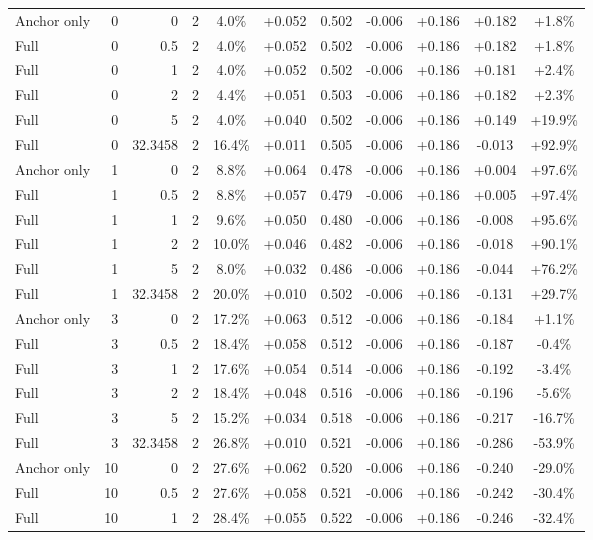 \begin{table}[htbp]
\begin{tabular}{lrrrccccccc}
Anchor only & 0 & 0 & 2 & 4.0\% & +0.052 & 0.502 & -0.006 & +0.186 & +0.182 & +1.8\% \\
Full & 0 & 0.5 & 2 & 4.0\% & +0.052 & 0.502 & -0.006 & +0.186 & +0.182 & +1.8\% \\
Full & 0 & 1 & 2 & 4.0\% & +0.052 & 0.502 & -0.006 & +0.186 & +0.181 & +2.4\% \\
Full & 0 & 2 & 2 & 4.4\% & +0.051 & 0.503 & -0.006 & +0.186 & +0.182 & +2.3\% \\
Full & 0 & 5 & 2 & 4.0\% & +0.040 & 0.502 & -0.006 & +0.186 & +0.149 & +19.9\% \\
Full & 0 & 32.3458 & 2 & 16.4\% & +0.011 & 0.505 & -0.006 & +0.186 & -0.013 & +92.9\% \\
Anchor only & 1 & 0 & 2 & 8.8\% & +0.064 & 0.478 & -0.006 & +0.186 & +0.004 & +97.6\% \\
Full & 1 & 0.5 & 2 & 8.8\% & +0.057 & 0.479 & -0.006 & +0.186 & +0.005 & +97.4\% \\
Full & 1 & 1 & 2 & 9.6\% & +0.050 & 0.480 & -0.006 & +0.186 & -0.008 & +95.6\% \\
Full & 1 & 2 & 2 & 10.0\% & +0.046 & 0.482 & -0.006 & +0.186 & -0.018 & +90.1\% \\
Full & 1 & 5 & 2 & 8.0\% & +0.032 & 0.486 & -0.006 & +0.186 & -0.044 & +76.2\% \\
Full & 1 & 32.3458 & 2 & 20.0\% & +0.010 & 0.502 & -0.006 & +0.186 & -0.131 & +29.7\% \\
Anchor only & 3 & 0 & 2 & 17.2\% & +0.063 & 0.512 & -0.006 & +0.186 & -0.184 & +1.1\% \\
Full & 3 & 0.5 & 2 & 18.4\% & +0.058 & 0.512 & -0.006 & +0.186 & -0.187 & -0.4\% \\
Full & 3 & 1 & 2 & 17.6\% & +0.054 & 0.514 & -0.006 & +0.186 & -0.192 & -3.4\% \\
Full & 3 & 2 & 2 & 18.4\% & +0.048 & 0.516 & -0.006 & +0.186 & -0.196 & -5.6\% \\
Full & 3 & 5 & 2 & 15.2\% & +0.034 & 0.518 & -0.006 & +0.186 & -0.217 & -16.7\% \\
Full & 3 & 32.3458 & 2 & 26.8\% & +0.010 & 0.521 & -0.006 & +0.186 & -0.286 & -53.9\% \\
Anchor only & 10 & 0 & 2 & 27.6\% & +0.062 & 0.520 & -0.006 & +0.186 & -0.240 & -29.0\% \\
Full & 10 & 0.5 & 2 & 27.6\% & +0.058 & 0.521 & -0.006 & +0.186 & -0.242 & -30.4\% \\
Full & 10 & 1 & 2 & 28.4\% & +0.055 & 0.522 & -0.006 & +0.186 & -0.246 & -32.4\% \\

\end{tabular}
\end{table}
